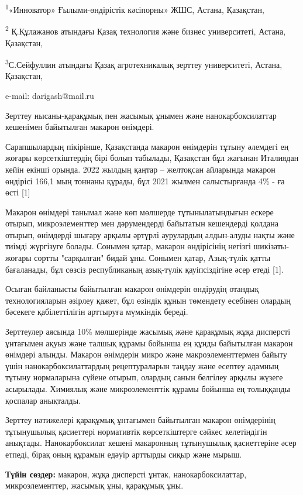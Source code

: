 \textsuperscript{1}«Инноватор» Ғылыми-өндірістік кәсіпорны» ЖШС, Астана,
Қазақстан,

\textsuperscript{2} Қ.Құлажанов атындағы Қазақ технология және бизнес
университеті, Астана, Қазақстан,

\textsuperscript{3}С.Сейфуллин атындағы Қазақ агротехникалық зерттеу
университеті, Астана, Қазақстан,

e-mail: darigash@mail.ru

Зерттеу нысаны-қарақұмық пен жасымық ұнымен және нанокарбоксилаттар
кешенімен байытылған макарон өнімдері.

Сарапшылардың пікірінше, Қазақстанда макарон өнімдерін тұтыну әлемдегі
ең жоғары көрсеткіштердің бірі болып табылады, Қазақстан бұл жағынан
Италиядан кейін екінші орында. 2022 жылдың қаңтар -- желтоқсан айларында
макарон өндірісі 166,1 мың тоннаны құрады, бұл 2021 жылмен салыстырғанда
4\% - ға өсті {[}1{]}

Макарон өнімдері танымал және көп мөлшерде тұтынылатындығын ескере
отырып, микроэлементтер мен дәрумендерді байытатын кешендерді қолдана
отырып, өнімдерді шығару арқылы әртүрлі аурулардың алдын-алуды нақты
және тиімді жүргізуге болады. Сонымен қатар, макарон өндірісінің негізгі
шикізаты-жоғары сортты "сарқылған" бидай ұны. Сонымен қатар, Азық-түлік
қатты бағаланады, бұл сөзсіз республиканың азық-түлік қауіпсіздігіне
әсер етеді {[}1{]}.

Осыған байланысты байытылған макарон өнімдерін өндірудің отандық
технологияларын әзірлеу қажет, бұл өзіндік құнын төмендету есебінен
олардың бәсекеге қабілеттілігін арттыруға мүмкіндік береді.

Зерттеулер аясында 10\% мөлшерінде жасымық және қарақұмық жұқа дисперсті
ұнтағымен ақуыз және талшық құрамы бойынша ең құнды байытылған макарон
өнімдері алынды. Макарон өнімдерін микро және макроэлементтермен байыту
үшін нанокарбоксилаттардың рецептураларын таңдау және есептеу адамның
тұтыну нормаларына сүйене отырып, олардың санын белгілеу арқылы жүзеге
асырылады. Химиялық және микроэлементтік құрамы бойынша ең толыққанды
қоспалар анықталды.

Зерттеу нәтижелері қарақұмық ұнтағымен байытылған макарон өнімдерінің
тұтынушылық қасиеттері нормативтік көрсеткіштерге сәйкес келетіндігін
анықтады. Нанокарбоксилат кешені макаронның тұтынушылық қасиеттеріне
әсер етпеді, бірақ оның құрамын едәуір арттырды сиқыр және мырыш.

{\bfseries Түйін сөздер:} макарон, жұқа дисперсті ұнтак,
нанокарбоксилаттар, микроэлементтер, жасымық ұны, қарақұмық ұны.

